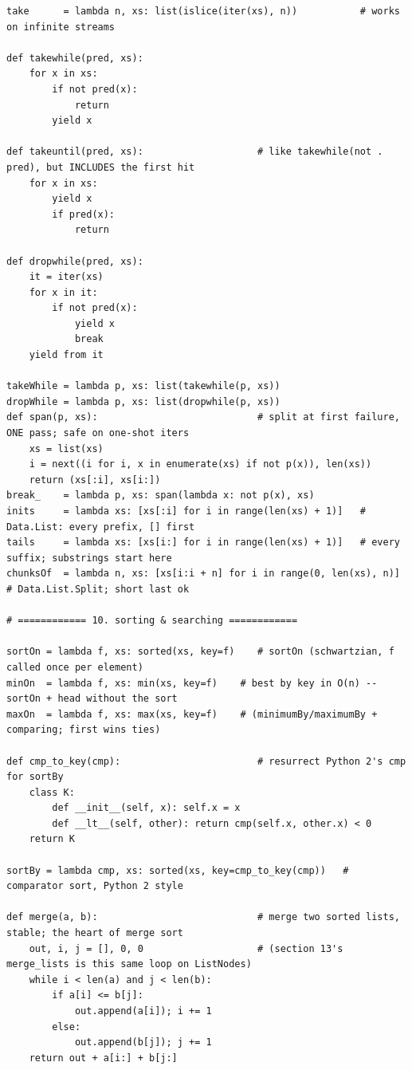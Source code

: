 \documentclass[10pt,letterpaper]{book}
\begin{document}
\begin{lstlisting}[style=file]
take      = lambda n, xs: list(islice(iter(xs), n))           # works on infinite streams

def takewhile(pred, xs):
    for x in xs:
        if not pred(x):
            return
        yield x

def takeuntil(pred, xs):                    # like takewhile(not . pred), but INCLUDES the first hit
    for x in xs:
        yield x
        if pred(x):
            return

def dropwhile(pred, xs):
    it = iter(xs)
    for x in it:
        if not pred(x):
            yield x
            break
    yield from it

takeWhile = lambda p, xs: list(takewhile(p, xs))
dropWhile = lambda p, xs: list(dropwhile(p, xs))
def span(p, xs):                            # split at first failure, ONE pass; safe on one-shot iters
    xs = list(xs)
    i = next((i for i, x in enumerate(xs) if not p(x)), len(xs))
    return (xs[:i], xs[i:])
break_    = lambda p, xs: span(lambda x: not p(x), xs)
inits     = lambda xs: [xs[:i] for i in range(len(xs) + 1)]   # Data.List: every prefix, [] first
tails     = lambda xs: [xs[i:] for i in range(len(xs) + 1)]   # every suffix; substrings start here
chunksOf  = lambda n, xs: [xs[i:i + n] for i in range(0, len(xs), n)]   # Data.List.Split; short last ok

# ============ 10. sorting & searching ============

sortOn = lambda f, xs: sorted(xs, key=f)    # sortOn (schwartzian, f called once per element)
minOn  = lambda f, xs: min(xs, key=f)    # best by key in O(n) -- sortOn + head without the sort
maxOn  = lambda f, xs: max(xs, key=f)    # (minimumBy/maximumBy + comparing; first wins ties)

def cmp_to_key(cmp):                        # resurrect Python 2's cmp for sortBy
    class K:
        def __init__(self, x): self.x = x
        def __lt__(self, other): return cmp(self.x, other.x) < 0
    return K

sortBy = lambda cmp, xs: sorted(xs, key=cmp_to_key(cmp))   # comparator sort, Python 2 style

def merge(a, b):                            # merge two sorted lists, stable; the heart of merge sort
    out, i, j = [], 0, 0                    # (section 13's merge_lists is this same loop on ListNodes)
    while i < len(a) and j < len(b):
        if a[i] <= b[j]:
            out.append(a[i]); i += 1
        else:
            out.append(b[j]); j += 1
    return out + a[i:] + b[j:]


\end{lstlisting}
\end{document}
